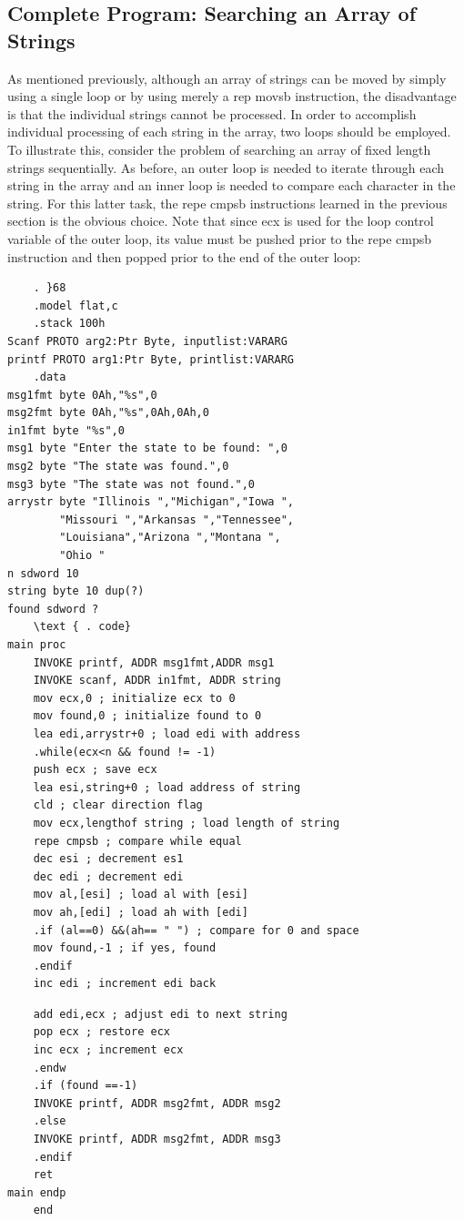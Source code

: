 \documentclass[10pt]{article}
\begin{document}
\subsection*{Complete Program: Searching an Array of Strings}
As mentioned previously, although an array of strings can be moved by simply using a single loop or by using merely a rep movsb instruction, the disadvantage is that the individual strings cannot be processed. In order to accomplish individual processing of each string in the array, two loops should be employed. To illustrate this, consider the problem of searching an array of fixed length strings sequentially. As before, an outer loop is needed to iterate through each string in the array and an inner loop is needed to compare each character in the string. For this latter task, the repe cmpsb instructions learned in the previous section is the obvious choice. Note that since ecx is used for the loop control variable of the outer loop, its value must be pushed prior to the repe cmpsb instruction and then popped prior to the end of the outer loop:

\begin{verbatim}
    . }68
    .model flat,c
    .stack 100h
Scanf PROTO arg2:Ptr Byte, inputlist:VARARG
printf PROTO arg1:Ptr Byte, printlist:VARARG
    .data
msg1fmt byte 0Ah,"%s",0
msg2fmt byte 0Ah,"%s",0Ah,0Ah,0
in1fmt byte "%s",0
msg1 byte "Enter the state to be found: ",0
msg2 byte "The state was found.",0
msg3 byte "The state was not found.",0
arrystr byte "Illinois ","Michigan","Iowa ",
        "Missouri ","Arkansas ","Tennessee",
        "Louisiana","Arizona ","Montana ",
        "Ohio "
n sdword 10
string byte 10 dup(?)
found sdword ?
    \text { . code}
main proc
    INVOKE printf, ADDR msg1fmt,ADDR msg1
    INVOKE scanf, ADDR in1fmt, ADDR string
    mov ecx,0 ; initialize ecx to 0
    mov found,0 ; initialize found to 0
    lea edi,arrystr+0 ; load edi with address
    .while(ecx<n && found != -1)
    push ecx ; save ecx
    lea esi,string+0 ; load address of string
    cld ; clear direction flag
    mov ecx,lengthof string ; load length of string
    repe cmpsb ; compare while equal
    dec esi ; decrement es1
    dec edi ; decrement edi
    mov al,[esi] ; load al with [esi]
    mov ah,[edi] ; load ah with [edi]
    .if (al==0) &&(ah== " ") ; compare for 0 and space
    mov found,-1 ; if yes, found
    .endif
    inc edi ; increment edi back
\end{verbatim}

\begin{verbatim}
    add edi,ecx ; adjust edi to next string
    pop ecx ; restore ecx
    inc ecx ; increment ecx
    .endw
    .if (found ==-1)
    INVOKE printf, ADDR msg2fmt, ADDR msg2
    .else
    INVOKE printf, ADDR msg2fmt, ADDR msg3
    .endif
    ret
main endp
    end
\end{verbatim}
\end{document}
